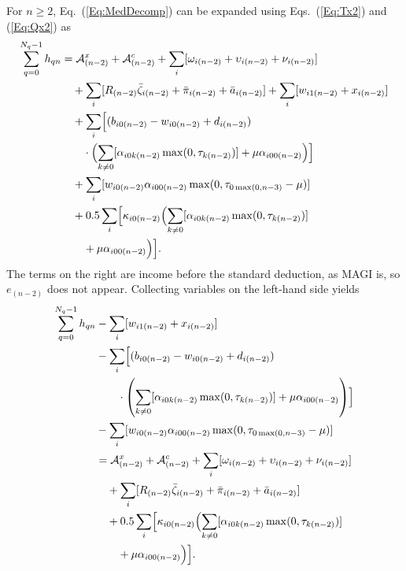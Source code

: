 \documentclass[fleqn,12pt]{report}
\begin{document}
	For $n \ge 2$, Eq.~(\ref{Eq:MedDecomp}) can be expanded using
	Eqs.~(\ref{Eq:Tx2}) and (\ref{Eq:Qx2}) as
	\begin{equation}
		\label{Eq:MedDecomp2}
		\begin{aligned}
		\sum_{q=0}^{N_q-1} h_{qn}
		&= \mathcal{A}^x_{(n-2)} + \mathcal{A}^c_{(n-2)}
		+ \sum_i [\omega_{i(n-2)} + \upsilon_{i(n-2)} + \nu_{i(n-2)}] \\
		&\quad + \sum_i [R_{(n-2)}\bar{\zeta}_{i(n-2)} + \bar{\pi}_{i(n-2)} + \bar{a}_{i(n-2)}]
		+ \sum_i [w_{i1(n-2)} + x_{i(n-2)}] \\
		&\quad + \sum_i \Bigl[(b_{i0(n-2)} - w_{i0(n-2)} + d_{i(n-2)}) \\
		&\qquad\cdot \Bigl(\sum_{k\neq 0}[\alpha_{i0k(n-2)}\max(0, \tau_{k(n-2)})] + \mu\alpha_{i00(n-2)}\Bigr)\Bigr] \\
		&\quad + \sum_i [w_{i0(n-2)}\alpha_{i00(n-2)}\max(0, \tau_{0\max(0, n-3)} - \mu)] \\
		&\quad + 0.5\sum_{i} \Bigl[\kappa_{i0(n-2)} \Bigl(\sum_{k\neq 0}[\alpha_{i0k(n-2)}\max(0, \tau_{k(n-2)})] \\
		&\qquad + \mu\alpha_{i00(n-2)}\Bigr)\Bigr].
		\end{aligned}
	\end{equation}
	The terms on the right are income before the standard deduction, as MAGI is, so
	$e_{(n-2)}$ does not appear.
	Collecting variables on the left-hand side yields
	\begin{equation}
		\label{Eq:MedDecomp3}
		\begin{aligned}
		\sum_{q=0}^{N_q-1} h_{qn}
		&- \sum_i [w_{i1(n-2)} + x_{i(n-2)}] \\
		&- \sum_i \Bigl[(b_{i0(n-2)} - w_{i0(n-2)} + d_{i(n-2)}) \\
		&\qquad\cdot \left(\sum_{k\neq 0}[\alpha_{i0k(n-2)}\max(0, \tau_{k(n-2)})]
		+ \mu\alpha_{i00(n-2)}\right)\Bigr] \\
		&- \sum_i [w_{i0(n-2)}\alpha_{i00(n-2)}\max(0, \tau_{0\max(0, n-3)} - \mu)] \\
		&= \mathcal{A}^x_{(n-2)} + \mathcal{A}^c_{(n-2)}
		+ \sum_i [\omega_{i(n-2)} + \upsilon_{i(n-2)} + \nu_{i(n-2)}] \\
		&\quad + \sum_i [R_{(n-2)}\bar{\zeta}_{i(n-2)} + \bar{\pi}_{i(n-2)} + \bar{a}_{i(n-2)}] \\
		&\quad + 0.5\sum_{i} \Bigl[\kappa_{i0(n-2)} \Bigl(\sum_{k\neq 0}[\alpha_{i0k(n-2)}\max(0, \tau_{k(n-2)})] \\
		&\qquad + \mu\alpha_{i00(n-2)}\Bigr)\Bigr].
		\end{aligned}
	\end{equation}
\end{document}
